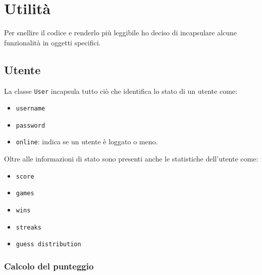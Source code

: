 \section{Utilità}
Per snellire il codice e renderlo più leggibile ho deciso di incapsulare alcune funzionalità in
oggetti specifici.

\subsection{Utente}
La classe \verb|User| incapsula tutto ciò che identifica lo stato di un utente come:
\begin{itemize}
	\item \verb|username|
	\item \verb|password|
	\item \verb|online|: indica se un utente è loggato o meno.
\end{itemize}
Oltre alle informazioni di stato sono presenti anche le statistiche dell'utente come:
\begin{itemize}
	\item \verb|score|
	\item \verb|games|
	\item \verb|wins|
	\item \verb|streaks|
	\item \verb|guess distribution|
\end{itemize}

\subsubsection{Calcolo del punteggio}